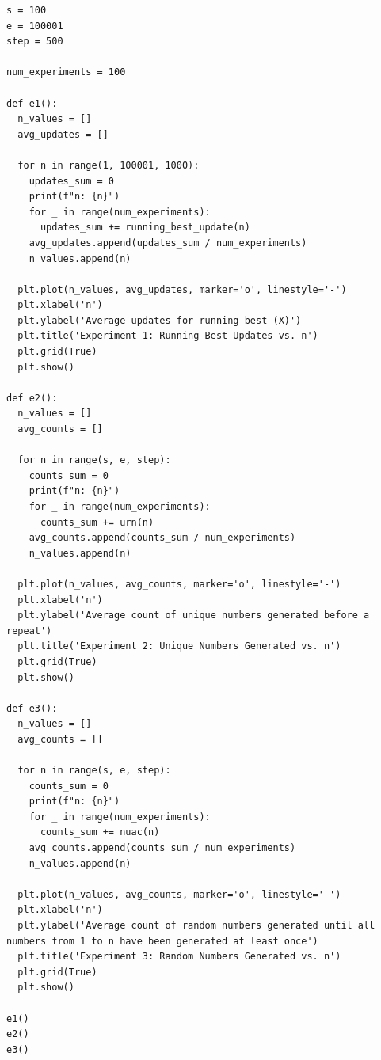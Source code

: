 \documentclass[addpoints]{exam}
\begin{document}
\begin{questions}
\begin{solution}
\begin{lstlisting}
s = 100
e = 100001
step = 500

num_experiments = 100

def e1():
  n_values = []
  avg_updates = []

  for n in range(1, 100001, 1000):
    updates_sum = 0
    print(f"n: {n}")
    for _ in range(num_experiments):
      updates_sum += running_best_update(n)
    avg_updates.append(updates_sum / num_experiments)
    n_values.append(n)

  plt.plot(n_values, avg_updates, marker='o', linestyle='-')
  plt.xlabel('n')
  plt.ylabel('Average updates for running best (X)')
  plt.title('Experiment 1: Running Best Updates vs. n')
  plt.grid(True)
  plt.show()

def e2():
  n_values = []
  avg_counts = []

  for n in range(s, e, step):
    counts_sum = 0
    print(f"n: {n}")
    for _ in range(num_experiments):
      counts_sum += urn(n)
    avg_counts.append(counts_sum / num_experiments)
    n_values.append(n)

  plt.plot(n_values, avg_counts, marker='o', linestyle='-')
  plt.xlabel('n')
  plt.ylabel('Average count of unique numbers generated before a repeat')
  plt.title('Experiment 2: Unique Numbers Generated vs. n')
  plt.grid(True)
  plt.show()

def e3():
  n_values = []
  avg_counts = []

  for n in range(s, e, step):
    counts_sum = 0
    print(f"n: {n}")
    for _ in range(num_experiments):
      counts_sum += nuac(n)
    avg_counts.append(counts_sum / num_experiments)
    n_values.append(n)

  plt.plot(n_values, avg_counts, marker='o', linestyle='-')
  plt.xlabel('n')
  plt.ylabel('Average count of random numbers generated until all numbers from 1 to n have been generated at least once')
  plt.title('Experiment 3: Random Numbers Generated vs. n')
  plt.grid(True)
  plt.show()

e1()
e2()
e3()
\end{lstlisting}
    \end{solution}
\end{questions}
\end{document}
